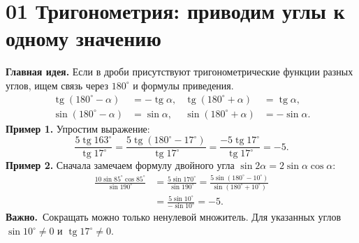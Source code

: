 \documentclass[a4paper,12pt]{article}
\newcommand{\tangent}{\operatorname{tg}}
\newcommand{\key}[1]{\textbf{\textcolor{darkaccent}{#1}}}
\newcommand{\attention}[1]{\medskip\noindent\textcolor{darkaccent}{\bfseries Важно.}\ #1\par\medskip}
\begin{document}
\section*{01 \quad Тригонометрия: приводим углы к одному значению}
\key{Главная идея.} Если в дроби присутствуют тригонометрические функции разных углов, ищем связь через $180^\circ$ и формулы приведения.
\[
\begin{aligned}
\tangent(180^\circ-\alpha)&=-\tangent\alpha,
&\tangent(180^\circ+\alpha)&=\tangent\alpha,\\
\sin(180^\circ-\alpha)&=\sin\alpha,
&\sin(180^\circ+\alpha)&=-\sin\alpha.
\end{aligned}
\]
\textbf{Пример 1.} Упростим выражение:
\[
\frac{5\tangent163^\circ}{\tangent17^\circ}
=\frac{5\tangent(180^\circ-17^\circ)}{\tangent17^\circ}
=\frac{-5\tangent17^\circ}{\tangent17^\circ}=\boxed{-5}.
\]
\textbf{Пример 2.} Сначала замечаем формулу двойного угла $\sin2\alpha=2\sin\alpha\cos\alpha$:
\[
\begin{aligned}
\frac{10\sin85^\circ\cos85^\circ}{\sin190^\circ}
&=\frac{5\sin170^\circ}{\sin190^\circ}
=\frac{5\sin(180^\circ-10^\circ)}{\sin(180^\circ+10^\circ)}\\
&=\frac{5\sin10^\circ}{-\sin10^\circ}=\boxed{-5}.
\end{aligned}
\]
\attention{Сокращать можно только ненулевой множитель. Для указанных углов $\sin10^\circ\ne0$ и $\tangent17^\circ\ne0$.}
\end{document}
